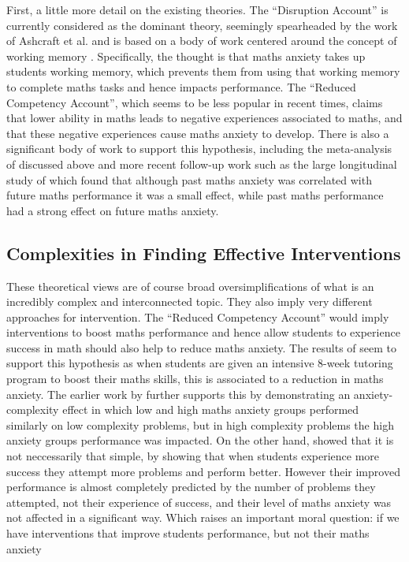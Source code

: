 \documentclass[14pt]{memoir}
\begin{document}
First, a little more detail on the existing theories. The ``Disruption Account'' is currently considered as the dominant theory, seemingly spearheaded by the work of Ashcraft et al. and is based on a body of work centered around the concept of working memory \cite{Ashcraft2001, Ashcraft2007}. Specifically, the thought is that maths anxiety takes up students working memory, which prevents them from using that working memory to complete maths tasks and hence impacts performance. The ``Reduced Competency Account'', which seems to be less popular in recent times, claims that lower ability in maths leads to negative experiences associated to maths, and that these negative experiences cause maths anxiety to develop. There is also a significant body of work to support this hypothesis, including the meta-analysis of  discussed above and more recent follow-up work such as the large longitudinal study of  which found that although past maths anxiety was correlated with future maths performance it was a small effect, while past maths performance had a strong effect on future maths anxiety.



\subsection*{Complexities in Finding Effective Interventions}

These theoretical views are of course broad oversimplifications of what is an incredibly complex and interconnected topic. They also imply very different approaches for intervention. The ``Reduced Competency Account'' would imply interventions to boost maths performance and hence allow students to experience success in math should also help to reduce maths anxiety. The results of   seem to support this hypothesis as when students are given an intensive 8-week tutoring program to boost their maths skills, this is associated to a reduction in maths anxiety. The earlier work by  further supports this by demonstrating an anxiety-complexity effect in which low and high maths anxiety groups performed similarly on low complexity problems, but in high complexity problems the high anxiety groups performance was impacted. On the other hand,  showed that it is not neccessarily that simple, by showing that when students experience more success they attempt more problems and perform better. However their improved performance is almost completely predicted by the number of problems they attempted, not their experience of success, and their level of maths anxiety was not affected in a significant way. Which raises an important moral question: if we have interventions that improve students performance, but not their maths anxiety
	
\end{document}
